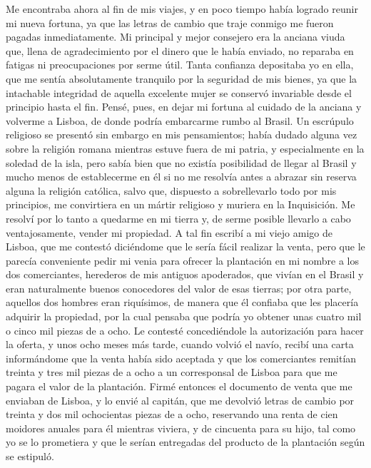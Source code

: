 \documentclass{novela}
\begin{document}
    Me encontraba ahora al fin de mis viajes, y en poco tiempo había logrado reunir mi nueva fortuna, ya que las letras de cambio que traje conmigo me fueron pagadas inmediatamente.
    Mi principal y mejor consejero era la anciana viuda que, llena de agradecimiento por el dinero que le había enviado, no reparaba en fatigas ni preocupaciones por serme útil. Tanta confianza depositaba yo en ella, que me sentía absolutamente tranquilo por la seguridad de mis bienes, ya que la intachable integridad de aquella excelente mujer se conservó invariable desde el principio hasta el fin.
    Pensé, pues, en dejar mi fortuna al cuidado de la anciana y volverme a Lisboa, de donde podría embarcarme rumbo al Brasil. Un escrúpulo religioso se presentó sin embargo en mis pensamientos; había dudado alguna vez sobre la religión romana mientras estuve fuera de mi patria, y especialmente en la soledad de la isla, pero sabía bien que no existía posibilidad de llegar al Brasil y mucho menos de establecerme en él si no me resolvía antes a abrazar sin reserva alguna la religión católica, salvo que, dispuesto a sobrellevarlo todo por mis principios, me convirtiera en un mártir religioso y muriera en la Inquisición. Me resolví por lo tanto a quedarme en mi tierra y, de serme posible llevarlo a cabo ventajosamente, vender mi propiedad.
    A tal fin escribí a mi viejo amigo de Lisboa, que me contestó diciéndome que le sería fácil realizar la venta, pero que le parecía conveniente pedir mi venia para ofrecer la plantación en mi nombre a los dos comerciantes, herederos de mis antiguos apoderados, que vivían en el Brasil y eran naturalmente buenos conocedores del valor de esas tierras; por otra parte, aquellos dos hombres eran riquísimos, de manera que él confiaba que les placería adquirir la propiedad, por la cual pensaba que podría yo obtener unas cuatro mil o cinco mil piezas de a ocho.
    Le contesté concediéndole la autorización para hacer la oferta, y unos ocho meses más tarde, cuando volvió el navío, recibí una carta informándome que la venta había sido aceptada y que los comerciantes remitían treinta y tres mil piezas de a ocho a un corresponsal de Lisboa para que me pagara el valor de la plantación.
    Firmé entonces el documento de venta que me enviaban de Lisboa, y lo envié al capitán, que me devolvió letras de cambio por treinta y dos mil ochocientas piezas de a ocho, reservando una renta de cien moidores anuales para él mientras viviera, y de cincuenta para su hijo, tal como yo se lo prometiera y que le serían entregadas del producto de la plantación según se estipuló.
\end{document}
